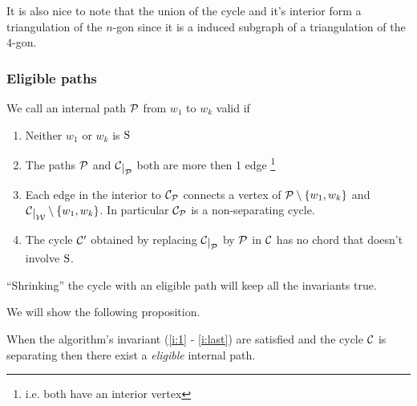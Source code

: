 It is also nice to note that the union of the cycle and it's interior form a triangulation of the $n$-gon since it is a induced subgraph of a triangulation of the $4$-gon.


\subsubsection{Eligible paths}



\begin{defi}
We call an internal path $\P$ from $w_1$ to $w_k$ valid if 
\begin{enumerate}
 \renewcommand*{\labelenumi}{(E\arabic{enumi})}%
 \renewcommand*{\theenumi}{(E\arabic{enumi})}%


\item Neither $w_1$ or $w_k$ is $\pS$ \label{e:notSr}
\item The paths $\P$ and $\restC \P$ both are more then 1 edge \footnote{i.e. both have an interior vertex} \label{e:length2borders}
\item Each edge in the interior to $\C_\P$ connects a vertex of $\P\setminus{\braces{w_1,w_k}}$ and $\restC \W \setminus{\braces{w_1,w_k}}$. In particular $\C_\P$ is a non-separating cycle.
\label{e:crossingedge}
\item The cycle $\C'$ obtained by replacing $\restC \P$ by $\P$ in $\C$ has no chord that doesn't involve $\pS$.
\label{e:noChordinC'}
\end{enumerate}
\end{defi}

\begin{remark}
``Shrinking'' the cycle with an eligible path will keep all the invariants true.
\end{remark}

We will show the following proposition.


\begin{thrm}
\label{th:eligExistence}
When the algorithm's invariant (\ref{i:1} - \ref{i:last}) are satisfied and the cycle $\C$ is separating then there exist a \emph{eligible} internal path.
\end{thrm}

